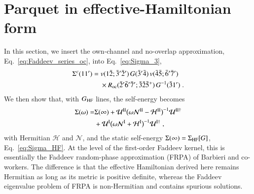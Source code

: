 \documentclass[aip,jcp,reprint,noshowkeys,superscriptaddress]{revtex4-1}
\begin{document}
\section{\label{sec:parquet_Heff}Parquet in effective-Hamiltonian form}
In this section, we insert the own-channel and no-overlap approximation,
Eq.~\eqref{eq:Faddeev_series_oc}, into Eq.~\eqref{eq:Sigma_3}, 
\begin{equation}
\begin{aligned}
\Sigma^{c}(11')
={}&
v(1\bar2;\bar3'\bar2')\,
G(\bar3'\bar4)\,
v(\bar4\bar5;\bar6'\bar7')
\\
&\times
R_{\rm oc}(\bar2'\bar6'\bar7';\bar3\bar2\bar5^+)\,
G^{-1}(\bar3 1') \;.
\end{aligned}
\label{eq:Sigma_oc}
\end{equation}
We then show that, with $G_{\rm HF}$ lines, the self-energy becomes
\begin{equation}
	\begin{aligned}
	\Sigma(\omega) = &
\Sigma(\infty)
+\mathcal U^{\rm II}\big(\omega\mathcal N^{\rm II}-\mathcal H^{\rm II}\big)^{-1}\mathcal U^{{\rm II}\dagger} \\
&
+\mathcal U^{\rm I}\big(\omega\mathcal N^{\rm I}+\mathcal H^{\rm I}\big)^{-1}\mathcal U^{{\rm I}\dagger} \;,
	\end{aligned}
\label{eq:Sigma_goal}
\end{equation}
with Hermitian $\mathcal H$ and $\mathcal N$, and the static self-energy
$\Sigma(\infty)=\Sigma_{\rm HF}[G]$, Eq.~\eqref{eq:Sigma_HF}.
At the level of the first-order Faddeev kernel, this is 
essentially the Faddeev random-phase approximation
(FRPA) of Barbieri and co-workers.
\cite{Barbieri2001,
barbieri2003extension,
barbieri2007quasiparticles,
Degroote2011}
The difference is that the effective Hamiltonian derived here
remains Hermitian as long as its metric is positive definite,
whereas the Faddeev eigenvalue problem of FRPA is non-Hermitian
and contains spurious solutions.\cite{Degroote2011}
\end{document}
